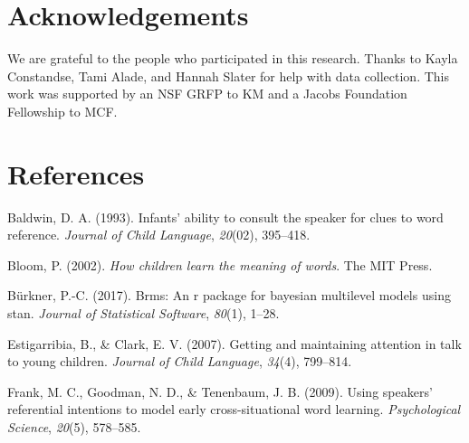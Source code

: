 \documentclass[10pt, letterpaper]{article}
\begin{document}
\vspace{1em}

\vspace{1em}

\hypertarget{acknowledgements}{%
\section{Acknowledgements}\label{acknowledgements}}

We are grateful to the people who participated in this research. Thanks
to Kayla Constandse, Tami Alade, and Hannah Slater for help with data
collection. This work was supported by an NSF GRFP to KM and a Jacobs
Foundation Fellowship to MCF.

\hypertarget{references}{%
\section{References}\label{references}}

\setlength{\parindent}{-0.1in} 
\setlength{\leftskip}{0.125in}

\noindent

\hypertarget{refs}{}
\leavevmode\hypertarget{ref-baldwin1993infants}{}%
Baldwin, D. A. (1993). Infants' ability to consult the speaker for clues
to word reference. \emph{Journal of Child Language}, \emph{20}(02),
395--418.

\leavevmode\hypertarget{ref-bloom2002children}{}%
Bloom, P. (2002). \emph{How children learn the meaning of words}. The
MIT Press.

\leavevmode\hypertarget{ref-burkner2017brms}{}%
Bürkner, P.-C. (2017). Brms: An r package for bayesian multilevel models
using stan. \emph{Journal of Statistical Software}, \emph{80}(1), 1--28.

\leavevmode\hypertarget{ref-estigarribia2007getting}{}%
Estigarribia, B., \& Clark, E. V. (2007). Getting and maintaining
attention in talk to young children. \emph{Journal of Child Language},
\emph{34}(4), 799--814.

\leavevmode\hypertarget{ref-frank2009using}{}%
Frank, M. C., Goodman, N. D., \& Tenenbaum, J. B. (2009). Using
speakers' referential intentions to model early cross-situational word
learning. \emph{Psychological Science}, \emph{20}(5), 578--585.
\end{document}
